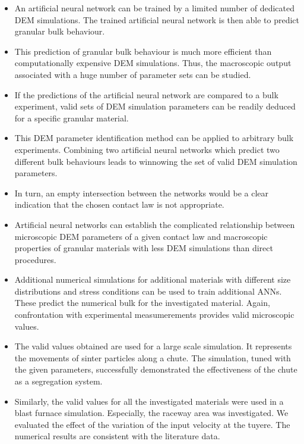 \begin{itemize}
  \item{An artificial neural network can be trained by a limited number of
  dedicated \acs{DEM} simulations.
  The trained artificial neural network is then able to predict
  granular bulk behaviour.}
  \item{This prediction of granular bulk behaviour is much more efficient
  than computationally expensive \acs{DEM} simulations.
  Thus, the macroscopic output associated with a huge number of parameter sets
  can be studied.}
  \item{If the predictions of the artificial neural network are compared to a bulk experiment,
  valid sets of \acs{DEM} simulation parameters can be readily deduced for a
  specific granular material.}
  \item{This \acs{DEM} parameter identification method can be applied to
  arbitrary bulk experiments.
  Combining two artificial neural networks which predict two different bulk
  behaviours leads to winnowing the set of valid \acs{DEM} simulation parameters.}
  \item{In turn, an empty intersection between the networks would be a clear
  indication that the chosen contact law is not appropriate.}
  \item{Artificial neural networks can establish the complicated relationship
  between microscopic \acs{DEM} parameters of a given contact law and macroscopic
  properties of granular materials with less \acs{DEM} simulations than direct
  procedures.}
  \item{Additional numerical simulations for additional materials with different
  size distributions and stress conditions can be used to train additional \acs{ANNs}. 
  These predict the numerical bulk for the investigated material. Again,
  confrontation with experimental measumerements provides valid microscopic
  values.}
  \item{The valid values obtained are used for a large scale simulation. It
  represents the movements of sinter particles along a chute. The simulation,
  tuned with the given parameters, successfully demonstrated the effectiveness
  of the chute as a segregation system.}
  \item{Similarly, the valid values for all the investigated materials were
  used in a blast furnace simulation. Especially, the raceway area was
  investigated. We evaluated the effect of the variation of the input velocity
  at the tuyere. The numerical results are consistent with the literature data.}
\end{itemize}
